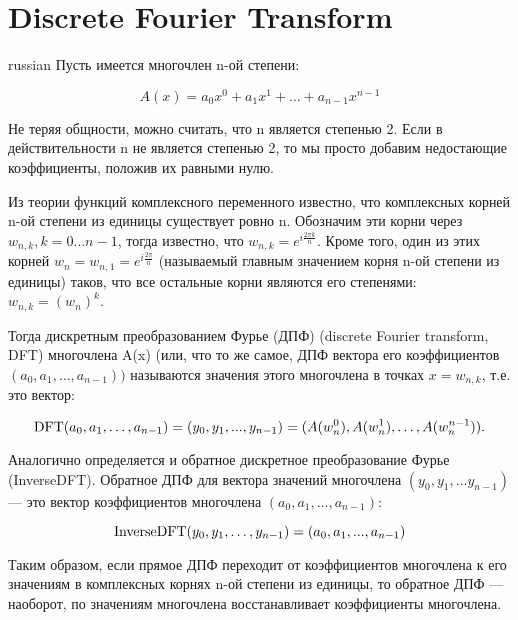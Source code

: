 \documentclass{article}
\begin{document}
\section{ Discrete Fourier Transform}
\begin{otherlanguage*}{russian}
    Пусть имеется многочлен n-ой степени:

     \[A(x) = a_0 x^0 + a_1 x^1 + \ldots + a_{n-1} x^{n-1}\]

     Не теряя общности, можно считать, что n является степенью 2. Если в действительности n не является степенью 2, то мы просто добавим недостающие коэффициенты, положив их равными нулю.

     Из теории функций комплексного переменного известно, что комплексных корней n-ой степени из единицы существует ровно n. Обозначим эти корни через $w_{n,k}, k = 0 \ldots {n-1}$, тогда известно, что $w_{n,k} = e^{ i \frac{ 2 \pi k }{ n } }$. Кроме того, один из этих корней $w_n = w_{n,1} = e^{ i \frac{ 2 \pi }{ n } }$ (называемый главным значением корня n-ой степени из единицы) таков, что все остальные корни являются его степенями: $w_{n,k} = (w_n)^k$.

     Тогда дискретным преобразованием Фурье (ДПФ) (discrete Fourier transform, DFT) многочлена A(x) (или, что то же самое, ДПФ вектора его коэффициентов $(a_0, a_1, \dots, a_{n-1}))$ называются значения этого многочлена в точках $x = w_{n,k}$, т.е. это вектор:

      \[{\rm DFT}(a_0, a_1, \ldots, a_{n-1}) = (y_0, y_1, ..., y_{n-1}) = (A(w_n^0), A(w_n^1), \ldots, A(w_n^{n-1})). \]

       Аналогично определяется и обратное дискретное преобразование Фурье (InverseDFT). Обратное ДПФ для вектора значений многочлена $(y_0, y_1, \ldots y_{n-1})$ — это вектор коэффициентов многочлена $(a_0, a_1, \ldots, a_{n-1})$:

        \[{\rm InverseDFT}(y_0, y_1, \ldots, y_{n-1}) = (a_0, a_1, ..., a_{n-1}) \]

        Таким образом, если прямое ДПФ переходит от коэффициентов многочлена к его значениям в комплексных корнях n-ой степени из единицы, то обратное ДПФ — наоборот, по значениям многочлена восстанавливает коэффициенты многочлена.
\end{otherlanguage*}
\end{document}
